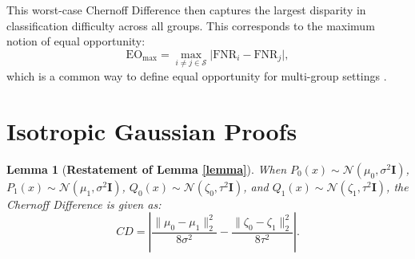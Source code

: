 \documentclass[11pt,letterpaper]{article}
\newtheorem{lemma}{Lemma}
\begin{document}
This worst-case Chernoff Difference then captures the largest disparity in classification difficulty across all groups. This corresponds to the maximum notion of equal opportunity:
\begin{equation}
\mathrm{EO}_{\max} =
\max_{i \neq j \in \mathcal{S}} \lvert \mathrm{FNR}_i - \mathrm{FNR}_j \rvert,
\end{equation}
which is a common way to define equal opportunity for multi-group settings \cite{hardt2016equality, alghamdi2022beyond}.


\section{Isotropic Gaussian Proofs} \label{sec:proofs}

\setcounter{figure}{0}

\setcounter{theorem}{0}
\begin{lemma}
    [\textbf{Restatement of Lemma \ref{lemma}}]
    When $P_0(x)\sim\mathcal{N}(\mu_0,\sigma^2\mathbf{I})$, $P_1(x)\sim\mathcal{N}(\mu_1,\sigma^2\mathbf{I})$, $Q_0(x)\sim\mathcal{N}(\zeta_0,\tau^2\mathbf{I})$, and $Q_1(x)\sim\mathcal{N}(\zeta_1,\tau^2\mathbf{I})$, the Chernoff Difference is given as:
    $$CD = \left|\frac{\|\mu_0 - \mu_1\|_2^2}{8\sigma^2} - \frac{\|\zeta_0 - \zeta_1\|_2^2}{8\tau^2}\right|.$$ 
\end{lemma}
\end{document}
